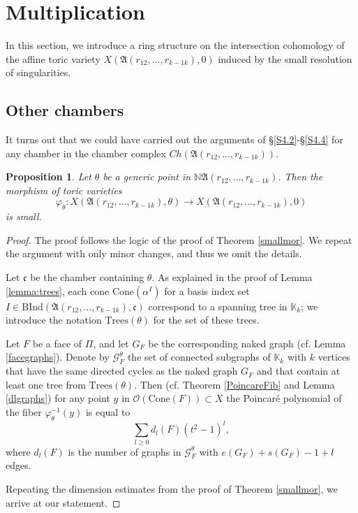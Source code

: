\documentclass[11pt]{article}
\newtheorem{prop}[theo]{Proposition}
\theoremstyle{definition}
\numberwithin{equation}{section}
\newcommand{\cone}{\mathrm{Cone}}
\newcommand{\A}{\mathfrak{A}}
\begin{document}
\section{Multiplication}\label{sec:multi}

In this section, we introduce a ring structure on the intersection cohomology 
of the affine toric variety $X(\A(r_{12}, \ldots ,r_{k-1 k}),0)$ induced by the 
small resolution of singularities.

\subsection{Other chambers}\label{S6.1}

It turns out that we could have carried out the arguments of 
\S\ref{S4.2}-\S\ref{S4.4}  for any chamber in the chamber complex 
$Ch(\A(r_{12}, \ldots ,r_{k-1 
k}))$.

\begin{prop}\label{allsmall}
	Let $\theta$ be a generic point in $\mathbb{N}\A(r_{12}, \ldots ,r_{k-1 k})$. 
	Then the morphism of toric varieties $$\varphi_\theta: 
	X(\A(r_{12}, \ldots ,r_{k-1 
	k}), \theta)\to X(\A(r_{12}, \ldots ,r_{k-1 k}),0)$$ is small.
\end{prop}
\begin{proof}
	The proof follows the logic of the proof of Theorem \ref{smallmor}. We 
	repeat the argument with only minor changes, and thus we omit the details.
	
	Let $\mathfrak{c}$ be the chamber containing $\theta$. As explained in the proof of Lemma \ref{lemma:trees}, each cone 
	$\cone(\alpha^I)$ for a basis index set 
	$I\in\mathrm{BInd}(\A(r_{12}, \ldots ,r_{k-1 k}), \mathfrak{c})$ correspond to a 
	spanning tree in $\mathbb{K}_k$; we introduce the notation 
	$\mathrm{Trees}(\theta)$ for the set of these trees. 
	
	Let $F$ be a face of $\Pi$, and let $G_F$ be the corresponding naked graph 
	(cf.  Lemma \ref{facegraphs}).
	Denote by $\mathcal{G}^{\theta}_F$  the set of connected subgraphs of 
	$\mathbb{K}_k$  with $k$ vertices that have the same directed cycles as the 
	naked graph $G_F$ and that contain at least one tree from 
	$\mathrm{Trees}(\theta)$.
	Then (cf.  Theorem \ref{PoincareFib} and Lemma \ref{dlgraphs}) for any 
	point  $y$ in $\mathcal{O}(\cone(F))\subset X$ the Poincar\'e polynomial of 
	the fiber $\varphi_\theta^{-1}(y)$ is equal to
	$$\sum_{l\geq 0} d_l(F)(t^2-1)^l,$$
	where $d_l(F)$ is the number of graphs in $\mathcal{G}^{\theta}_F$ with 
	$e(G_F)+s(G_F)-1+l$ edges. 
	
	Repeating the dimension estimates from the proof of Theorem \ref{smallmor}, 
	we arrive at our statement.
\end{proof}
\end{document}
